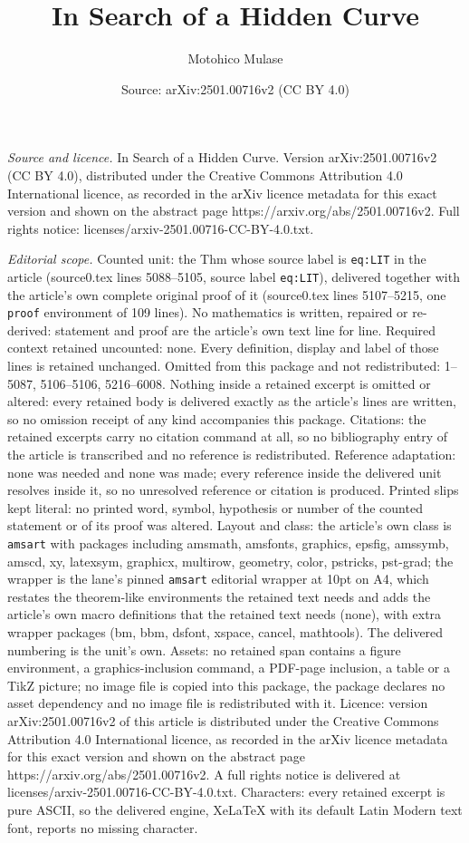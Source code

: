 \documentclass[10pt,a4paper]{amsart}
\title[In Search of a Hidden Curve]{In Search of a Hidden Curve}
\author{Motohico Mulase}
\date{Source: arXiv:2501.00716v2 (CC BY 4.0)}
\begin{document}
\maketitle

\noindent\emph{Source and licence.} In Search of a Hidden Curve. Version arXiv:2501.00716v2 (CC BY 4.0), distributed under the Creative Commons Attribution 4.0 International licence, as recorded in the arXiv licence metadata for this exact version and shown on the abstract page https://arxiv.org/abs/2501.00716v2. Full rights notice: licenses/arxiv-2501.00716-CC-BY-4.0.txt.\par\smallskip

\noindent\textit{Editorial scope.} Counted unit: the Thm whose source label is \texttt{eq:LIT} in the article (source0.tex lines 5088--5105, source label \texttt{eq:LIT}), delivered together with the article's own complete original proof of it (source0.tex lines 5107--5215, one \texttt{proof} environment of 109 lines). No mathematics is written, repaired or re-derived: statement and proof are the article's own text line for line. Required context retained uncounted: none. Every definition, display and label of those lines is retained unchanged. Omitted from this package and not redistributed: 1--5087, 5106--5106, 5216--6008. Nothing inside a retained excerpt is omitted or altered: every retained body is delivered exactly as the article's lines are written, so no omission receipt of any kind accompanies this package. Citations: the retained excerpts carry no citation command at all, so no bibliography entry of the article is transcribed and no reference is redistributed. Reference adaptation: none was needed and none was made; every reference inside the delivered unit resolves inside it, so no unresolved reference or citation is produced. Printed slips kept literal: no printed word, symbol, hypothesis or number of the counted statement or of its proof was altered. Layout and class: the article's own class is \texttt{amsart} with packages including amsmath, amsfonts, graphics, epsfig, amssymb, amscd, xy, latexsym, graphicx, multirow, geometry, color, pstricks, pst-grad; the wrapper is the lane's pinned \texttt{amsart} editorial wrapper at 10pt on A4, which restates the theorem-like environments the retained text needs and adds the article's own macro definitions that the retained text needs (none), with extra wrapper packages (bm, bbm, dsfont, xspace, cancel, mathtools). The delivered numbering is the unit's own. Assets: no retained span contains a figure environment, a graphics-inclusion command, a PDF-page inclusion, a table or a TikZ picture; no image file is copied into this package, the package declares no asset dependency and no image file is redistributed with it. Licence: version arXiv:2501.00716v2 of this article is distributed under the Creative Commons Attribution 4.0 International licence, as recorded in the arXiv licence metadata for this exact version and shown on the abstract page https://arxiv.org/abs/2501.00716v2. A full rights notice is delivered at licenses/arxiv-2501.00716-CC-BY-4.0.txt. Characters: every retained excerpt is pure ASCII, so the delivered engine, XeLaTeX with its default Latin Modern text font, reports no missing character.
\end{document}
